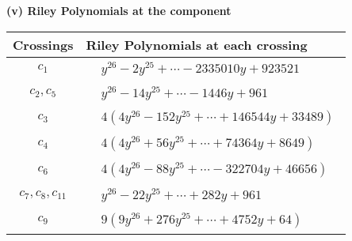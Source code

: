 \documentclass[1p]{elsarticle_modified}
\theoremstyle{definition}
\begin{document}
\newpage\renewcommand{\arraystretch}{1}
\flushleft \textbf{(v) Riley Polynomials at the component}\newline \\
\begin{tabular}{m{50pt}|m{274pt}}
Crossings & \hspace{64pt}Riley Polynomials at each crossing \\
\hline $$\begin{aligned}c_{1}\end{aligned}$$&$\begin{aligned}
&y^{26}-2 y^{25}+\cdots-2335010 y+923521
\end{aligned}$\\
\hline $$\begin{aligned}c_{2},c_{5}\end{aligned}$$&$\begin{aligned}
&y^{26}-14 y^{25}+\cdots-1446 y+961
\end{aligned}$\\
\hline $$\begin{aligned}c_{3}\end{aligned}$$&$\begin{aligned}
&4(4 y^{26}-152 y^{25}+\cdots+146544 y+33489)
\end{aligned}$\\
\hline $$\begin{aligned}c_{4}\end{aligned}$$&$\begin{aligned}
&4(4 y^{26}+56 y^{25}+\cdots+74364 y+8649)
\end{aligned}$\\
\hline $$\begin{aligned}c_{6}\end{aligned}$$&$\begin{aligned}
&4(4 y^{26}-88 y^{25}+\cdots-322704 y+46656)
\end{aligned}$\\
\hline $$\begin{aligned}c_{7},c_{8},c_{11}\end{aligned}$$&$\begin{aligned}
&y^{26}-22 y^{25}+\cdots+282 y+961
\end{aligned}$\\
\hline $$\begin{aligned}c_{9}\end{aligned}$$&$\begin{aligned}
&9(9 y^{26}+276 y^{25}+\cdots+4752 y+64)
\end{aligned}$\\

\end{tabular}
\end{document}
